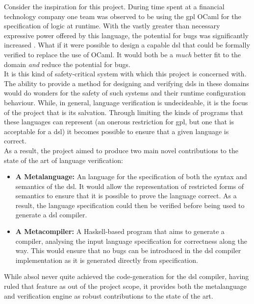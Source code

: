 Consider the inspiration for this project.
During time spent at a financial technology company one team was observed to be using the \gls{gpl} OCaml for the specification of logic at runtime. 
With the vastly greater than necessary expressive power offered by this language, the potential for bugs was significantly increased \citep{subramanyam2003empirical}.
What if it were possible to design a capable \gls{dsl} that could be formally verified to replace the use of OCaml.
It would both be a \textit{much} better fit to the domain \textit{and} reduce the potential for bugs.\\

It is this kind of safety-critical system with which this project is concerned with.
The ability to provide a method for designing and verifying \glspl{dsl} in these domains would do wonders for the safety of such systems and their runtime configuration behaviour.
While, in general, language verification is undecideable, it is the focus of the project that is its salvation.
Through limiting the kinds of programs that these languages can represent (an onerous restriction for \gls{gpl}, but one that is acceptable for a \gls{dsl}) it becomes possible to ensure that a given language is correct.\\

As a result, the project aimed to produce two main novel contributions to the state of the art of language verification:
\begin{itemize}
    \item \textbf{A Metalanguage:} An language for the specification of both the \gls{syntax} and \gls{semantics} of the \gls{dsl}. 
    It would allow the representation of restricted forms of semantics to ensure that it is possible to prove the language correct.
    As a result, the language specification could then be verified before being used to generate a \gls{dsl} compiler. 
    \item \textbf{A Metacompiler:} A Haskell-based program that aims to generate a compiler, analysing the input language specification for correctness along the way.
    This would ensure that no bugs can be introduced in the \gls{dsl} compiler implementation as it is generated directly from specification.
\end{itemize}

While \gls{absol} never quite achieved the code-generation for the \gls{dsl} compiler, having ruled that feature as out of the project scope, it provides both the metalanguage and verification engine as robust contributions to the state of the art. 

